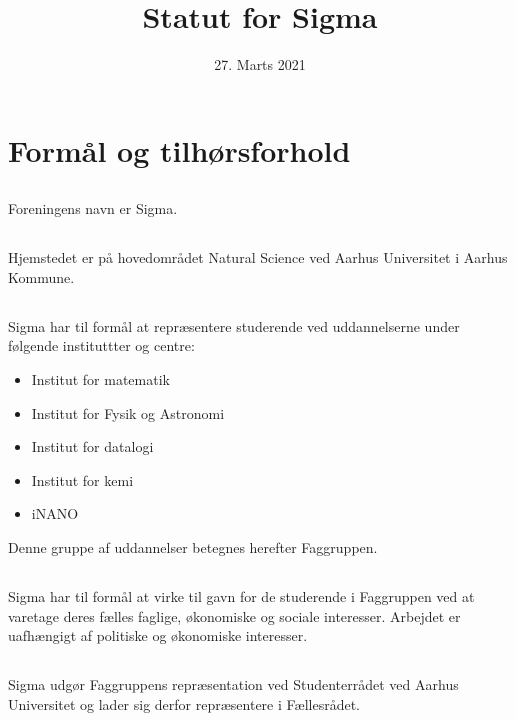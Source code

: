 \documentclass[danish,a4paper,twocolumn]{article}
\newcommand{\foreningen}{Sigma}
\begin{document}
\title{\vspace{-2ex}Statut for \foreningen\vspace{-5ex}}
\date{27. Marts 2021}
\maketitle

\section{Formål og tilhørsforhold}
\subsection{}Foreningens navn er \foreningen.
\subsection{}Hjemstedet er på hovedområdet Natural Science
ved Aarhus Universitet i Aarhus Kommune.

\subsection{}Sigma har til formål at repræsentere studerende ved
uddannelserne under følgende instituttter og centre:
\begin{itemize}
        \item Institut for matematik
        \item Institut for Fysik og Astronomi
        \item Institut for datalogi
        \item Institut for kemi
        \item iNANO
\end{itemize}
Denne gruppe af uddannelser betegnes herefter Faggruppen.
\subsection{}Sigma har til formål at virke til gavn for de studerende i Faggruppen ved at varetage deres fælles faglige, økonomiske og sociale interesser. Arbejdet er uafhængigt af politiske og økonomiske interesser.
\subsection{}Sigma udgør Faggruppens repræsentation ved Studenterrådet ved Aarhus Universitet og lader sig derfor repræsentere i Fællesrådet.
\end{document}
